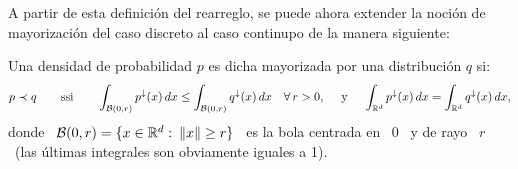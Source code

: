 %
\begin{figure}[h!]
%
\begin{center}  \end{center}
%
\label{Fig:MP:ensemblerearreglado}
\end{figure}

A partir de esta definici\'on del rearreglo, se puede ahora extender la noci\'on
de mayorizaci\'on del caso discreto al caso continupo de la manera siguiente:
%
\begin{definicion}
\label{Def:MP:MayorizacionContinua}
%
  Una densidad  de probabilidad $p$  es dicha mayorizada por  una distribuci\'on
  $q$ si:
  \[
  p \prec  q \qquad \mbox{ssi}  \qquad \int_{\mathcal{B}(0,r)} p^\downarrow(x) \,  dx \le
  \int_{\mathcal{B}(0,r)} q^\downarrow(x) \, dx \quad \forall  \, r > 0, \quad \mbox{ y }
  \quad \int_{\mathbb{R}^d} p^\downarrow(x) \, dx = \int_{\mathbb{R}^d} q^\downarrow(x) \,
  dx,
  \]
  donde \ $\mathcal{B}(0,r) = \{ x \in \mathbb{R}^d:  \: \|x\| \ge r \}$ \ es la bola centrada
  en \ $0$ \ y de rayo  \ $r$ \ (las \'ultimas integrales son obviamente iguales
  a 1).
\end{definicion}
%



\label{Ssec:MP:Transformacion}

